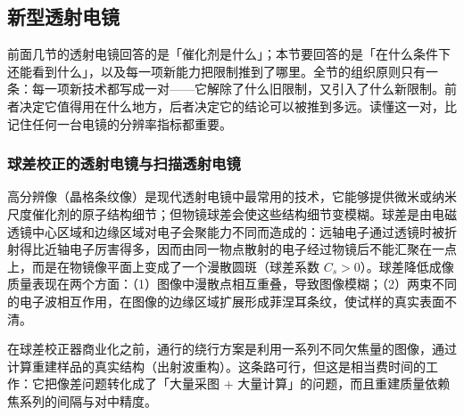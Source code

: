 \subsection{新型透射电镜}

前面几节的透射电镜回答的是「催化剂是什么」；本节要回答的是「在什么条件下还能看到什么」，以及每一项新能力把限制推到了哪里。全节的组织原则只有一条：每一项新技术都写成一对——它解除了什么旧限制，又引入了什么新限制。前者决定它值得用在什么地方，后者决定它的结论可以被推到多远。读懂这一对，比记住任何一台电镜的分辨率指标都重要。

\subsubsection{球差校正的透射电镜与扫描透射电镜}

高分辨像（晶格条纹像）是现代透射电镜中最常用的技术，它能够提供微米或纳米尺度催化剂的原子结构细节；但物镜球差会使这些结构细节变模糊。球差是由电磁透镜中心区域和边缘区域对电子会聚能力不同而造成的：远轴电子通过透镜时被折射得比近轴电子厉害得多，因而由同一物点散射的电子经过物镜后不能汇聚在一点上，而是在物镜像平面上变成了一个漫散圆斑（球差系数 $C_s>0$）。球差降低成像质量表现在两个方面：（1）图像中漫散点相互重叠，导致图像模糊；（2）两束不同的电子波相互作用，在图像的边缘区域扩展形成菲涅耳条纹，使试样的真实表面不清。

在球差校正器商业化之前，通行的绕行方案是利用一系列不同欠焦量的图像，通过计算重建样品的真实结构（出射波重构）。这条路可行，但这是相当费时间的工作：它把像差问题转化成了「大量采图 $+$ 大量计算」的问题，而且重建质量依赖焦系列的间隔与对中精度。


